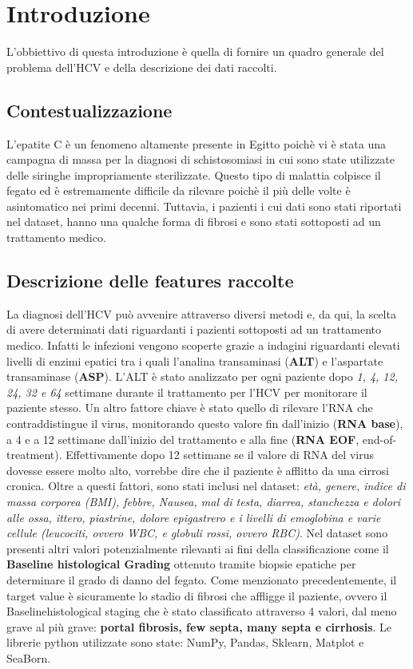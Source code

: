 \section{Introduzione}\label{sec:Introduction}
L'obbiettivo di questa introduzione è quella di fornire un quadro generale del problema dell'HCV e della descrizione dei dati raccolti.
\subsection{Contestualizzazione}\label{ssec:Context}

L'epatite C è un fenomeno altamente presente in Egitto poichè vi è stata una campagna di massa per la diagnosi di schistosomiasi in cui sono state utilizzate delle siringhe impropriamente sterilizzate. Questo tipo di malattia colpisce il fegato ed è estremamente difficile da rilevare poichè il più delle volte è asintomatico nei primi decenni. Tuttavia, i pazienti i cui dati sono stati riportati nel dataset, hanno una qualche forma di fibrosi e sono stati sottoposti ad un trattamento medico.
\subsection{Descrizione delle features raccolte}

La diagnosi dell'HCV può avvenire attraverso diversi metodi e, da qui, la scelta di avere determinati dati riguardanti i pazienti sottoposti ad un trattamento medico. Infatti le infezioni vengono scoperte grazie a indagini riguardanti elevati livelli di enzimi epatici tra i quali l'analina transaminasi (\textbf{ALT}) e l'aspartate transaminase (\textbf{ASP}). L'ALT è stato analizzato per ogni paziente dopo \textit{1, 4, 12, 24, 32 e 64} settimane durante il trattamento per l'HCV per monitorare il paziente stesso. Un altro fattore chiave è stato quello di rilevare l'RNA che contraddistingue il virus, monitorando questo valore fin dall'inizio (\textbf{RNA base}), a 4 e a 12 settimane dall'inizio del trattamento e alla fine (\textbf{RNA EOF}, end-of-treatment). Effettivamente dopo 12 settimane se il valore di RNA del virus dovesse essere molto alto, vorrebbe dire che il paziente è afflitto da una cirrosi cronica. Oltre a questi fattori, sono stati inclusi nel dataset: \textit{età, genere, indice di massa corporea (BMI), febbre, Nausea, mal di testa, diarrea, stanchezza e dolori alle ossa, ittero, piastrine, dolore epigastrero e i livelli di emoglobina e varie cellule (leucociti, ovvero WBC, e globuli rossi, ovvero RBC)}. Nel dataset sono presenti altri valori potenzialmente rilevanti ai fini della classificazione come il \textbf{Baseline histological Grading} ottenuto tramite biopsie epatiche per determinare il grado di danno del fegato. Come menzionato precedentemente, il target value è sicuramente lo stadio di fibrosi che affligge il paziente, ovvero il Baselinehistological staging che è stato classificato attraverso 4 valori, dal meno grave al più grave: \textbf{portal fibrosis, few septa, many septa e cirrhosis}.
\newline Le librerie python utilizzate sono state: NumPy, Pandas, Sklearn, Matplot e SeaBorn.\cite{sklearn}


